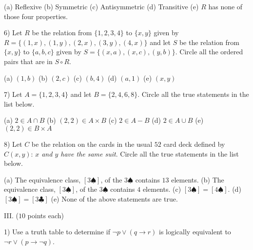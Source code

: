 \documentclass[11pt]{amsart}
\begin{document}
\vskip 5pt
\hskip 20pt (a) Reflexive\hfill
\vskip 5pt
\hskip 20pt {\color{red}(b) Symmetric}\hfill
\vskip 5pt
\hskip 20pt (c) Antisymmetric\hfill
\vskip 5pt
\hskip 20pt (d) Transitive\hfill
\vskip 5pt
\hskip 20pt (e) $R$ has none of those four properties.\hfill

\vfill

6) Let $R$ be the relation from $\{1,2,3,4\}$ to $\{x,y\}$ given by $R=\{(1,x), (1,y),(2,x),(3,y),(4,x)\}$\vskip -1pt\hskip 13pt  and let $S$ be the relation from $\{x,y\}$ to $\{a,b,c\}$
given by $S = \{(x,a),(x,c),(y,b)\}.$\vskip -1pt\hskip 13pt 
 Circle all the ordered pairs that are in $S\circ R$.  


\vskip 4pt
\hskip 20pt {\color{red}(a) $(1,b)$}\hfill
\vskip 4pt
\hskip 20pt {\color{red}(b) $(2,c)$}\hfill
\vskip 4pt
\hskip 20pt (c) $(b,4)$\hfill
\vskip 4pt
\hskip 20pt (d) $(a,1)$\hfill
\vskip 4pt
\hskip 20pt (e) $(x,y)$\hfill

\vfill

7) Let  $A =\{ 1,2,3,4\}$ and let $B=\{2,4,6,8\}$. Circle all the  
true statements in the list below.

\vskip 3pt
\hskip 20pt {\color{red}(a) $2\in A\cap B$}\hfill
\vskip 3pt
\hskip 20pt{\color{red}(b) $(2,2)\in A\times B$}\hfill
\vskip 3pt
\hskip 20pt (c) $2\in A-B$\hfill
\vskip 3pt
\hskip 20pt {\color{red}(d) $2\in A\cup B$} \hfill
\vskip 3pt
\hskip 20pt {\color{red}(e) $(2,2)\in B\times A$} \hfill

\vfill

8) Let $C$ be the relation on the cards in the usual $52$ card deck defined by 
$C(x,y)$: {\it $x$ and 
\vskip -1pt\hskip 13pt $y$ have the same suit}. Circle all the  
true statements in the list below.

\vskip 3pt
\hskip 20pt {\color{red}(a) The equivalence class, $[3\spadesuit]$, of the $3\spadesuit$ contains $13$ elements.}\hfill
\vskip 3pt
\hskip 20pt (b) The equivalence class, $[3\spadesuit]$, of the $3\spadesuit$ contains $4$ elements.\hfill
\vskip 3pt
\hskip 20pt {\color{red}(c) $[3\spadesuit]=[4\spadesuit]$.}\hfill
\vskip 3pt
\hskip 20pt (d) $[3\spadesuit]=[3\clubsuit]$ \hfill
\vskip 3pt
\hskip 20pt (e) None of the above statements are true.\hfill

\vfill
\break

III. ($10$ points each)  



1) Use a truth table to determine if $\lnot p \lor (q\to r)$ is logically 
equivalent to $\lnot r\lor (p\to \lnot q)$.\\[3pt]
\end{document}
